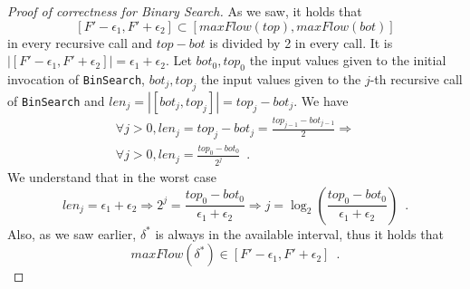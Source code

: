 \begin{proof}[Proof of correctness for Binary Search]
  As we saw, it holds that
  \begin{equation*}
    \left[F' - \epsilon_1, F' + \epsilon_2\right] \subset \left[maxFlow\left(top\right), maxFlow\left(bot\right)\right]
  \end{equation*}
  in every recursive call and $top - bot$ is divided by 2 in every call.
  It is $|[F' - \epsilon_1, F' + \epsilon_2]| = \epsilon_1 + \epsilon_2$. Let
  $bot_0, top_0$ the input values given to the initial invocation of \texttt{BinSearch}, $bot_j,top_j$ the input
  values given to the $j$-th recursive call of \texttt{BinSearch} and $len_j =|[bot_j, top_j]| = top_j - bot_j$. We have
  \begin{equation*}
  \begin{gathered}
    \forall j > 0, len_j = top_j - bot_j = \frac{top_{j-1} - bot_{j-1}}{2} \Rightarrow \\
    \forall j >0, len_j = \frac{top_0 - bot_0}{2^j} \enspace.
  \end{gathered}
  \end{equation*}
  We understand that in the worst case
  \begin{equation*}
    len_j = \epsilon_1 + \epsilon_2 \Rightarrow 2^j = \frac{top_0-bot_0}{\epsilon_1 + \epsilon_2} \Rightarrow
    j = \log_2(\frac{top_0-bot_0}{\epsilon_1+\epsilon_2}) \enspace.
  \end{equation*}
  Also, as we saw earlier, $\delta^*$ is always in the available interval, thus it holds that
  \begin{equation*}
    maxFlow\left(\delta^*\right) \in \left[F' - \epsilon_1, F' + \epsilon_2\right] \enspace.
  \end{equation*}
\end{proof}
